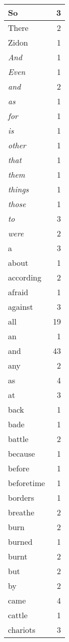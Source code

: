 \begin{center}
\begin{longtable}{l|r}
So & 3 \\ \hline
There & 2 \\ \hline
Zidon & 1 \\ \hline
\emph{And} & 1 \\ \hline
\emph{Even} & 1 \\ \hline
\emph{and} & 2 \\ \hline
\emph{as} & 1 \\ \hline
\emph{for} & 1 \\ \hline
\emph{is} & 1 \\ \hline
\emph{other} & 1 \\ \hline
\emph{that} & 1 \\ \hline
\emph{them} & 1 \\ \hline
\emph{things} & 1 \\ \hline
\emph{those} & 1 \\ \hline
\emph{to} & 3 \\ \hline
\emph{were} & 2 \\ \hline
a & 3 \\ \hline
about & 1 \\ \hline
according & 2 \\ \hline
afraid & 1 \\ \hline
against & 3 \\ \hline
all & 19 \\ \hline
an & 1 \\ \hline
and & 43 \\ \hline
any & 2 \\ \hline
as & 4 \\ \hline
at & 3 \\ \hline
back & 1 \\ \hline
bade & 1 \\ \hline
battle & 2 \\ \hline
because & 1 \\ \hline
before & 1 \\ \hline
beforetime & 1 \\ \hline
borders & 1 \\ \hline
breathe & 2 \\ \hline
burn & 2 \\ \hline
burned & 1 \\ \hline
burnt & 2 \\ \hline
but & 2 \\ \hline
by & 2 \\ \hline
came & 4 \\ \hline
cattle & 1 \\ \hline
chariots & 3 \\ \hline

\end{longtable}
\end{center}
